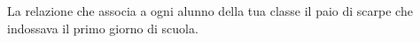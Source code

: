 La relazione che associa a ogni alunno della tua classe il paio di scarpe che indossava il primo giorno di
scuola. %
